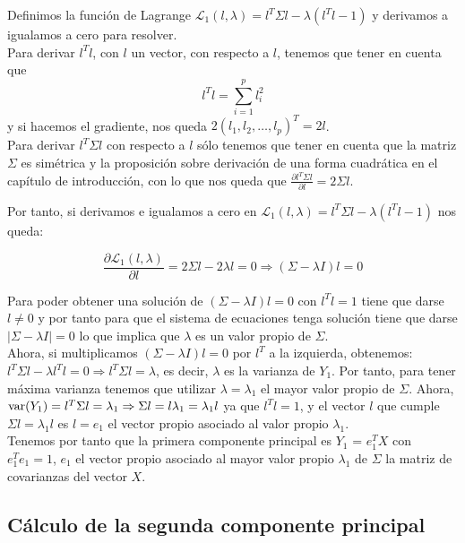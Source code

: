 Definimos la función de Lagrange $\mathcal{L}_1(l, \lambda) = l^T \Sigma l - \lambda(l^Tl - 1)$
y derivamos a igualamos a cero para resolver.\\

Para derivar $l^Tl$, con $l$ un vector, con respecto a $l$, tenemos que tener en cuenta que 
\[	l^Tl = \sum_{i=1}^p l_i^2	\]
y si hacemos el gradiente, nos queda $2(l_1, l_2, \dots, l_p)^T = 2l$.\\

Para derivar $l^T \Sigma l$ con respecto a $l$ sólo tenemos que tener en cuenta que la matriz $\Sigma$ es simétrica y la proposición sobre derivación de una forma cuadrática en el capítulo de introducción, con lo que nos queda que $\frac{\partial l^T \Sigma l}{\partial l} = 2 \Sigma l$.

Por tanto, si derivamos e igualamos a cero en $\mathcal{L}_1(l, \lambda) = l^T \Sigma l - \lambda(l^Tl - 1)$ nos queda:

\[	\frac{\partial \mathcal{L}_1(l, \lambda)}{\partial l} = 2 \Sigma l - 2 \lambda l = 0 \Rightarrow (\Sigma - \lambda I)l = 0
	\]

Para poder obtener una solución de $(\Sigma - \lambda I)l = 0$ con $l^Tl=1$ tiene que darse $l \neq 0$ y por tanto para que el sistema de ecuaciones tenga solución tiene que darse $|\Sigma - \lambda I| = 0$ lo que implica que $\lambda$ es un valor propio de $\Sigma$.\\
Ahora, si multiplicamos $(\Sigma - \lambda I)l = 0$ por $l^T$ a la izquierda, obtenemos:
$l^T \Sigma l - \lambda l^Tl = 0 \Rightarrow l^T \Sigma l = \lambda$, es decir, $\lambda$ es la varianza de $Y_1$. Por tanto, para tener máxima varianza tenemos que utilizar $\lambda = \lambda_1$ el mayor valor propio de $\Sigma$. Ahora, $\text{var}{(Y_1)} = l^T \Sigma l = \lambda_1 \Rightarrow \Sigma l = l \lambda_1 = \lambda_1 l$ ya que $l^Tl=1$, y el vector $l$ que cumple $\Sigma l = \lambda_1 l$ es $l = e_1$ el vector propio asociado al valor propio $\lambda_1$.\\

Tenemos por tanto que la primera componente principal es $Y_1$ = $e^T_1X$ con $e_1^Te_1 = 1$, $e_1$ el vector propio asociado al mayor valor propio $\lambda_1$ de $\Sigma$ la matriz de covarianzas del vector $X$.

\subsection{Cálculo de la segunda componente principal}

